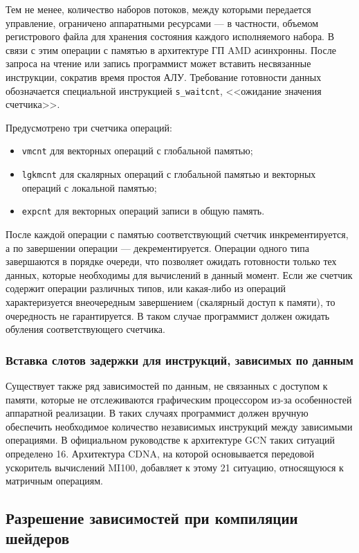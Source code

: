 \documentclass[a4paper,14pt]{extarticle}
\newenvironment{ul}{\begin{itemize}[noitemsep,topsep=0em]}{\end{itemize}\vspace{4mm}}
\begin{document}
Тем не менее, количество наборов потоков, между которыми передается управление, ограничено
аппаратными ресурсами — в частности, объемом регистрового файла для хранения состояния каждого
исполняемого набора. В связи с этим операции с памятью в архитектуре ГП AMD асинхронны.
После запроса на чтение или запись программист может вставить несвязанные инструкции,
сократив время простоя АЛУ. Требование готовности данных обозначается специальной
инструкцией \texttt{s\_waitcnt}, <<ожидание значения счетчика>>.

Предусмотрено три счетчика операций:
\begin{ul}
\item \texttt{vmcnt} для векторных операций с глобальной памятью;
\item \texttt{lgkmcnt} для скалярных операций с глобальной памятью и векторных операций с локальной памятью;
\item \texttt{expcnt} для векторных операций записи в общую память.
\end{ul}

После каждой операции с памятью соответствующий счетчик инкрементируется, а по завершении
операции — декрементируется. Операции одного типа завершаются в порядке очереди, что
позволяет ожидать готовности только тех данных, которые необходимы для вычислений в данный
момент. Если же счетчик содержит операции различных типов, или какая-либо из операций
характеризуется внеочередным завершением (скалярный доступ к памяти), то очередность не гарантируется.
В таком случае программист должен ожидать обуления соответствующего счетчика.

\subsubsection{Вставка слотов задержки для инструкций, зависимых по данным}

Существует также ряд зависимостей по данным, не связанных с доступом к памяти,
которые не отслеживаются графическим процессором из-за особенностей аппаратной реализации.
В таких случаях программист должен вручную обеспечить необходимое количество независимых
инструкций между зависимыми операциями. В официальном руководстве к архитектуре GCN
таких ситуаций определено 16\cite{vega-isa}. Архитектура CDNA, на которой основывается передовой ускоритель
вычислений MI100, добавляет к этому 21 ситуацию, относящуюся к матричным операциям\cite{cdna-isa}.

\subsection{Разрешение зависимостей при компиляции шейдеров}
\end{document}
